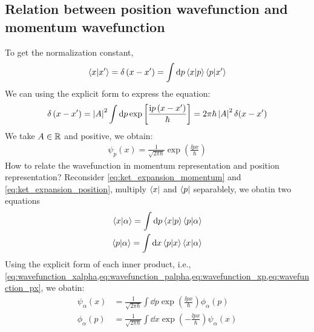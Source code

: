 \subsection{Relation between position wavefunction and momentum wavefunction}
To get the normalization constant, 
\begin{eqnarray}
    \braket{x|x'} = \delta\left(x-x'\right) = \int \mathrm{d} p \braket{x|p} \braket{p|x'}
\end{eqnarray}
We can using the explicit form to express the equation: 
\begin{eqnarray}
    \delta\left(x-x'\right) = \left| A \right|^2 \int \mathrm{d} p \exp\left[ \frac{\mathrm{i} p \left(x - x'\right)}{\hbar} \right] = 2 \pi \hbar \left| A \right|^2 \delta(x-x')
\end{eqnarray}
We take $A\in \mathbb{R}$ and positive, we obtain: 
\begin{eqnarray}
    \psi_p(x) = \frac{1}{\sqrt{2 \pi \hbar}} \exp\left(\frac{\ii p x}{\hbar}\right) 
\end{eqnarray} 
How to relate the wavefunction in momentum representation and position representation? Reconsider \cref{eq:ket_expansion_momentum} and \cref{eq:ket_expansion_position}, multiply $\bra{x}$ and $\bra{p}$ separablely, we obatin two equations 
\begin{align}
    \braket{x|\alpha} = \int \mathrm{d} p \braket{x|p} \braket{p|\alpha} \label{eq:relation_xalpha}\\
    \braket{p|\alpha} = \int \mathrm{d} x \braket{p|x} \braket{x|\alpha} \label{eq:relation_palpha}
\end{align}
Using the explicit form of each inner product, i.e., \cref{eq:wavefunction_xalpha,eq:wavefunction_palpha,eq:wavefunction_xp,eq:wavefunction_px}, we obatin: 
\begin{align}
    \psi_ \alpha(x) &= \frac{1}{\sqrt{2 \pi \hbar}} \int \dd p \exp \left(\frac{\ii p x}{\hbar}\right) \phi_ \alpha(p) \label{eq:wavefunction_relation_dp} \\
    \phi_ \alpha(p) &= \frac{1}{\sqrt{2 \pi \hbar}} \int \dd x \exp \left(-\frac{\ii p x}{\hbar}\right) \psi_ \alpha(x)
\end{align}




